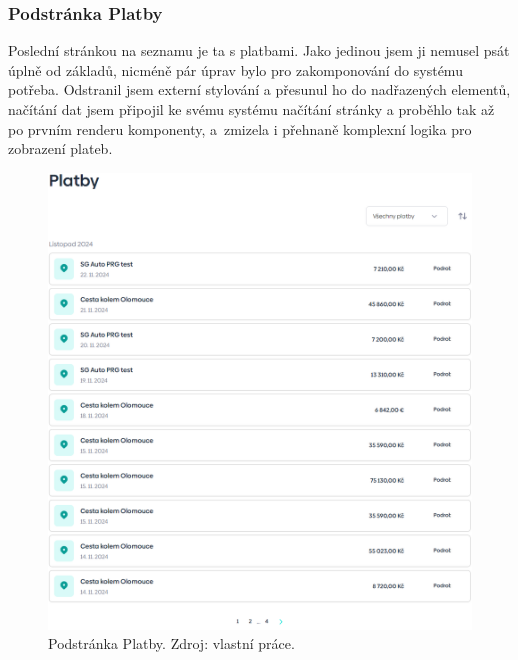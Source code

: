 \newpage
\subsubsection{Podstránka Platby}
Poslední stránkou na seznamu je ta s platbami. Jako jedinou jsem ji nemusel psát úplně od základů, nicméně pár úprav bylo pro zakomponování do systému potřeba. Odstranil jsem externí stylování a přesunul ho do nadřazených elementů, načítání dat jsem připojil ke svému systému načítání stránky a proběhlo tak až po prvním renderu komponenty, a~zmizela i přehnaně komplexní logika pro zobrazení plateb.
\\
\begin{figure}[!h]
    \centering
    \includegraphics[width=0.9\linewidth]{obrazky/platby.png}
    \caption{Podstránka Platby. Zdroj: vlastní práce.}
\end{figure}